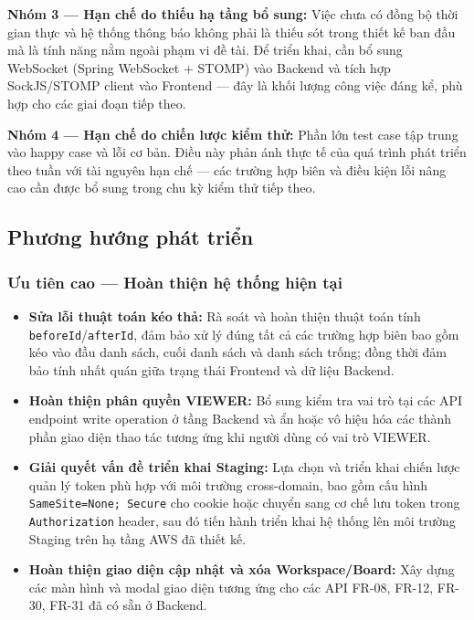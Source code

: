 \textbf{Nhóm 3 — Hạn chế do thiếu hạ tầng bổ sung:}
Việc chưa có đồng bộ thời gian thực và hệ thống thông báo không phải là thiếu sót trong thiết kế ban đầu mà là tính năng nằm ngoài phạm vi đề tài. Để triển khai, cần bổ sung WebSocket (Spring WebSocket + STOMP) vào Backend và tích hợp SockJS/STOMP client vào Frontend — đây là khối lượng công việc đáng kể, phù hợp cho các giai đoạn tiếp theo.

\textbf{Nhóm 4 — Hạn chế do chiến lược kiểm thử:}
Phần lớn test case tập trung vào happy case và lỗi cơ bản. Điều này phản ánh thực tế của quá trình phát triển theo tuần với tài nguyên hạn chế — các trường hợp biên và điều kiện lỗi nâng cao cần được bổ sung trong chu kỳ kiểm thử tiếp theo.

\subsection{Phương hướng phát triển}

\subsubsection{Ưu tiên cao — Hoàn thiện hệ thống hiện tại}

\begin{itemize}
    \item \textbf{Sửa lỗi thuật toán kéo thả:} Rà soát và hoàn thiện thuật toán tính \texttt{beforeId}/\texttt{afterId}, đảm bảo xử lý đúng tất cả các trường hợp biên bao gồm kéo vào đầu danh sách, cuối danh sách và danh sách trống; đồng thời đảm bảo tính nhất quán giữa trạng thái Frontend và dữ liệu Backend.
    \item \textbf{Hoàn thiện phân quyền VIEWER:} Bổ sung kiểm tra vai trò tại các API endpoint write operation ở tầng Backend và ẩn hoặc vô hiệu hóa các thành phần giao diện thao tác tương ứng khi người dùng có vai trò VIEWER.
    \item \textbf{Giải quyết vấn đề triển khai Staging:} Lựa chọn và triển khai chiến lược quản lý token phù hợp với môi trường cross-domain, bao gồm cấu hình \texttt{SameSite=None; Secure} cho cookie hoặc chuyển sang cơ chế lưu token trong \texttt{Authorization} header, sau đó tiến hành triển khai hệ thống lên môi trường Staging trên hạ tầng AWS đã thiết kế.
    \item \textbf{Hoàn thiện giao diện cập nhật và xóa Workspace/Board:} Xây dựng các màn hình và modal giao diện tương ứng cho các API FR-08, FR-12, FR-30, FR-31 đã có sẵn ở Backend.
\end{itemize}

